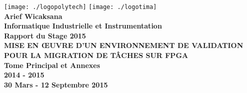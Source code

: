 \centering
\texttt{[image: ./logopolytech]}
\hfill
\texttt{[image: ./logotima]}
\\[4cm]
\centering
\DoubleSpacing
\textbf{\Large Arief Wicaksana} \\
\textbf{\Large Informatique Industrielle et Instrumentation} \\
\textbf{\Large Rapport du Stage 2015} \\[4 cm]
\textbf{\Large MISE EN ŒUVRE D'UN ENVIRONNEMENT DE VALIDATION POUR LA MIGRATION DE TÂCHES SUR FPGA} \\[4 cm]
\textbf{\Large Tome Principal et Annexes}\\
\vfill
\textbf{2014 - 2015}\\
\textbf{30 Mars - 12 Septembre 2015}